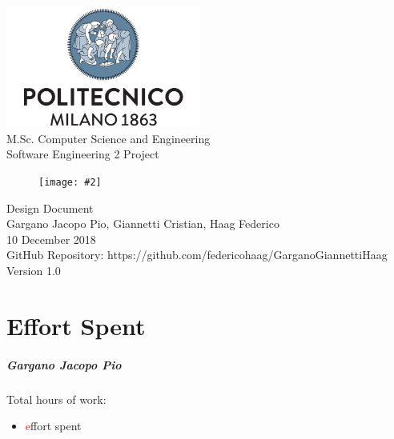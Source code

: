 \documentclass{report}
\newcommand\todo[1]{\textcolor{red}{#1}}
\newcommand{\image}[4]{
	\begin{figure}[H]
	\centering
	\texttt{[image: \#2]}
	\caption*{#3}
	\label{#4}

	\label{fig:nonfloat} %
	\end{figure}
}
\begin{document}
	\begin{titlepage}
		\centering	
		\vfill
		{
			\includegraphics[width =\linewidth, height = 4cm, keepaspectratio]{PolitecnicoLogo.png}
			\label{fig:PolitecnicoLogo}
			\large \\[2ex]M.Sc. Computer Science and Engineering\\
			\large Software Engineering 2 Project\\[9ex]			
			\image{5cm}{TrackMeLogo.png}{}{TrackMeLogo}
			\huge Design Document\\[4ex]

			\normalsize Gargano Jacopo Pio, Giannetti Cristian, Haag Federico\\[1.5ex]
			\normalsize 10 December 2018 \\[1.5ex]
			\normalsize GitHub Repository: https://github.com/federicohaag/GarganoGiannettiHaag\\[3ex]
			\normalsize Version 1.0
		}
		
	\end{titlepage}

	\newpage
	\tableofcontents
	\thispagestyle{fancy}
	
	\newpage
	
	
	
	
	
	
		
	\chapter{Effort Spent}
	\thispagestyle{fancy}
		\paragraph{Gargano Jacopo Pio} Total hours of work: 
			\begin{itemize}
				\item\todo effort spent
			\end{itemize}
\end{document}
